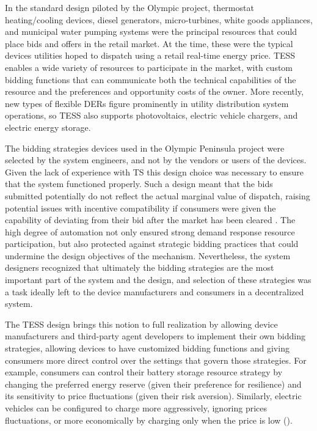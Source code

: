 \documentclass[12pt]{article}{Definitions/mdpi}
\begin{document}
In the standard design piloted by the Olympic project, thermostat heating/cooling devices, diesel generators, micro-turbines, white goods appliances, and municipal water pumping systems were the principal resources that could place bids and offers in the retail market.  At the time, these were the typical devices utilities hoped to dispatch using a retail real-time energy price. 
TESS enables a wide variety of resources to participate in the market, with custom bidding functions that can communicate both the technical capabilities of the resource and the preferences and opportunity costs of the owner.
More recently, new types of flexible DERs figure prominently in utility distribution system operations, so TESS also supports photovoltaics, electric vehicle chargers, and electric energy storage.

The bidding strategies devices used in the Olympic Peninsula project were selected by the system engineers, and not by the vendors or users of the devices. Given the lack of experience with TS this design choice was necessary to ensure that the system functioned properly. 
Such a design meant that the bids submitted potentially do not reflect the actual marginal value of dispatch, raising potential issues with incentive compatibility if consumers were given the capability of deviating from their bid after the market has been cleared \citep{lian_transactive_2020}. 
The high degree of automation not only ensured strong demand response resource participation, but also protected against strategic bidding practices that could undermine the design objectives of the mechanism.
Nevertheless, the system designers recognized that ultimately the bidding strategies are the most important part of the system and the design, and selection of these strategies was a task ideally left to the device manufacturers and consumers in a decentralized system.

The TESS design brings this notion to full realization by allowing device manufacturers and third-party agent developers to implement their own bidding strategies, allowing devices to have customized bidding functions and giving consumers more direct control over the settings that govern those strategies. For example, consumers can control their battery storage resource strategy by changing the preferred energy reserve (given their preference for resilience) and its sensitivity to price fluctuations (given their risk aversion). Similarly, electric vehicles can be configured to charge more aggressively, ignoring prices fluctuations, or more economically by charging only when the price is low (\cite{behboodi_electric_2016}). 
\end{document}
